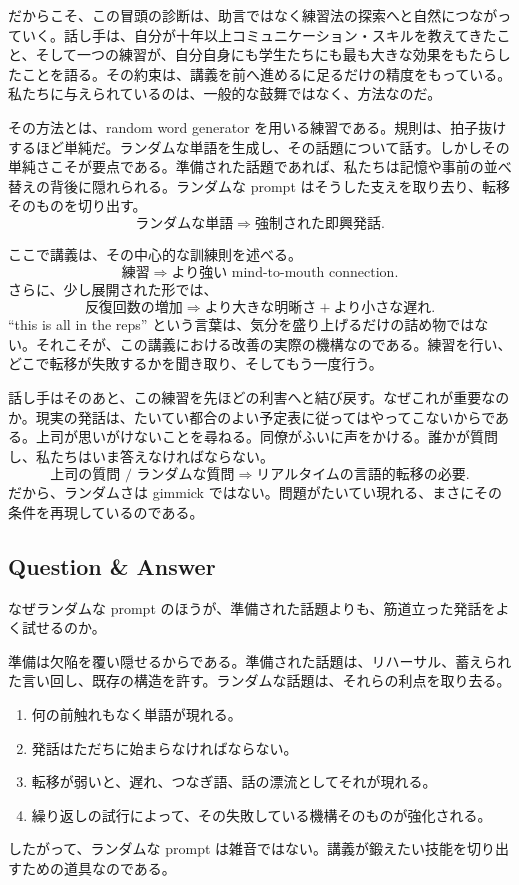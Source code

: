 だからこそ、この冒頭の診断は、助言ではなく練習法の探索へと自然につながっていく。話し手は、自分が十年以上コミュニケーション・スキルを教えてきたこと、そして一つの練習が、自分自身にも学生たちにも最も大きな効果をもたらしたことを語る。その約束は、講義を前へ進めるに足るだけの精度をもっている。私たちに与えられているのは、一般的な鼓舞ではなく、方法なのだ。

その方法とは、random word generator を用いる練習である。規則は、拍子抜けするほど単純だ。ランダムな単語を生成し、その話題について話す。しかしその単純さこそが要点である。準備された話題であれば、私たちは記憶や事前の並べ替えの背後に隠れられる。ランダムな prompt はそうした支えを取り去り、転移そのものを切り出す。
\begin{equation}
\text{ランダムな単語} \Longrightarrow \text{強制された即興発話}.
\end{equation}

ここで講義は、その中心的な訓練則を述べる。
\begin{equation}
\text{練習} \Longrightarrow \text{より強い mind-to-mouth connection}.
\end{equation}
さらに、少し展開された形では、
\begin{equation}
\text{反復回数の増加} \Longrightarrow \text{より大きな明晰さ} + \text{より小さな遅れ}.
\end{equation}
``this is all in the reps'' という言葉は、気分を盛り上げるだけの詰め物ではない。それこそが、この講義における改善の実際の機構なのである。練習を行い、どこで転移が失敗するかを聞き取り、そしてもう一度行う。

話し手はそのあと、この練習を先ほどの利害へと結び戻す。なぜこれが重要なのか。現実の発話は、たいてい都合のよい予定表に従ってはやってこないからである。上司が思いがけないことを尋ねる。同僚がふいに声をかける。誰かが質問し、私たちはいま答えなければならない。
\begin{equation}
\text{上司の質問 / ランダムな質問} \Longrightarrow \text{リアルタイムの言語的転移の必要}.
\end{equation}
だから、ランダムさは gimmick ではない。問題がたいてい現れる、まさにその条件を再現しているのである。

\subsection{Question \& Answer}

なぜランダムな prompt のほうが、準備された話題よりも、筋道立った発話をよく試せるのか。

準備は欠陥を覆い隠せるからである。準備された話題は、リハーサル、蓄えられた言い回し、既存の構造を許す。ランダムな話題は、それらの利点を取り去る。
\begin{enumerate}
\item 何の前触れもなく単語が現れる。
\item 発話はただちに始まらなければならない。
\item 転移が弱いと、遅れ、つなぎ語、話の漂流としてそれが現れる。
\item 繰り返しの試行によって、その失敗している機構そのものが強化される。
\end{enumerate}
したがって、ランダムな prompt は雑音ではない。講義が鍛えたい技能を切り出すための道具なのである。

